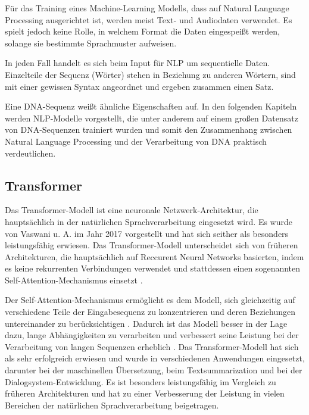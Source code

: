 \documentclass[oneside,bibliography=totocnumbered,BCOR=5mm]{scrbook}%
\theoremstyle{definition}
\theoremstyle{definition}
\theoremstyle{definition}
\theoremstyle{definition}
\theoremstyle{definition}
\theoremstyle{definition}
\begin{document}
Für das Training eines Machine-Learning Modells, dass auf Natural Language Processing 
ausgerichtet ist, werden meist Text- und Audiodaten verwendet. 
Es spielt jedoch keine Rolle, in welchem Format die Daten eingespeißt werden, 
solange sie bestimmte Sprachmuster aufweisen. 


In jeden Fall handelt es sich beim Input für NLP um sequentielle Daten. 
Einzelteile der Sequenz (Wörter) stehen in Beziehung zu anderen Wörtern, 
sind mit einer gewissen Syntax angeordnet und ergeben zusammen einen Satz. 


Eine DNA-Sequenz weißt ähnliche Eigenschaften auf. In den folgenden Kapiteln werden 
NLP-Modelle vorgestellt, die unter anderem auf einem großen Datensatz von DNA-Sequenzen 
trainiert wurden und somit den Zusammenhang zwischen Natural Language Processing und der
Verarbeitung von DNA praktisch verdeutlichen.


\subsection{Transformer}


Das Transformer-Modell ist eine neuronale Netzwerk-Architektur, 
die hauptsächlich in der natürlichen Sprachverarbeitung eingesetzt wird. 
Es wurde von Vaswani u. A. \autocite{transformer} im Jahr 2017 vorgestellt und 
hat sich seither als besonders leistungsfähig erwiesen. 
Das Transformer-Modell unterscheidet sich von früheren Architekturen, 
die hauptsächlich auf Reccurent Neural Networks basierten, 
indem es keine rekurrenten Verbindungen verwendet und stattdessen einen sogenannten 
Self-Attention-Mechanismus einsetzt \autocite[Seite 1]{transformer}.


Der Self-Attention-Mechanismus ermöglicht es dem Modell, sich gleichzeitig auf verschiedene 
Teile der Eingabesequenz zu konzentrieren und deren Beziehungen untereinander zu 
berücksichtigen \autocite[Seite 1]{transformer}. 
Dadurch ist das Modell besser in der Lage dazu, lange Abhängigkeiten zu verarbeiten und 
verbessert seine Leistung bei der Verarbeitung von langen Sequenzen erheblich \autocite[Seite 1]{transformer}. 
Das Transformer-Modell hat sich als sehr erfolgreich erwiesen und wurde in verschiedenen Anwendungen eingesetzt, 
darunter bei der maschinellen Übersetzung, beim Textsummarization und bei der Dialogsystem-Entwicklung. 
Es ist besonders leistungsfähig im Vergleich zu früheren Architekturen und hat zu einer Verbesserung der Leistung 
in vielen Bereichen der natürlichen Sprachverarbeitung beigetragen.
\end{document}
